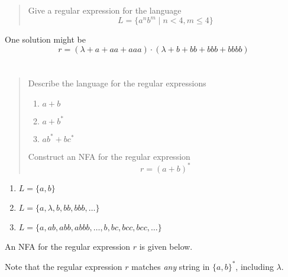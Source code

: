 \documentclass{article}
\begin{document}
\section{}
\begin{quote}
    Give a regular expression for the language
    \[L = \{a^n b^m \mid n < 4, m \leq 4\} \]
\end{quote}

One solution might be
\[r = (\lambda + a + aa + aaa) \cdot (\lambda + b + bb + bbb + bbbb) \]

\section{}
\begin{quote}
    Describe the language for the regular expressions
    \begin{enumerate}
        \item $a + b$
        \item $a + b^*$
        \item $ab^* + bc^*$
    \end{enumerate}
    Construct an NFA for the regular expression
    \[r = {(a + b)}^*\]
\end{quote}

\begin{enumerate}
    \item $L = \{a, b\}$
    \item $L = \{a, \lambda, b, bb, bbb, \dots \}$
    \item $L = \{a, ab, abb, abbb, \dots, b, bc, bcc, bcc, \dots \}$
\end{enumerate}

An NFA for the regular expression $r$ is given below.

\begin{center}
\end{center}

Note that the regular expression $r$ matches \textit{any} string in ${\{a, b\}}^*$, including
$\lambda$.
\end{document}
